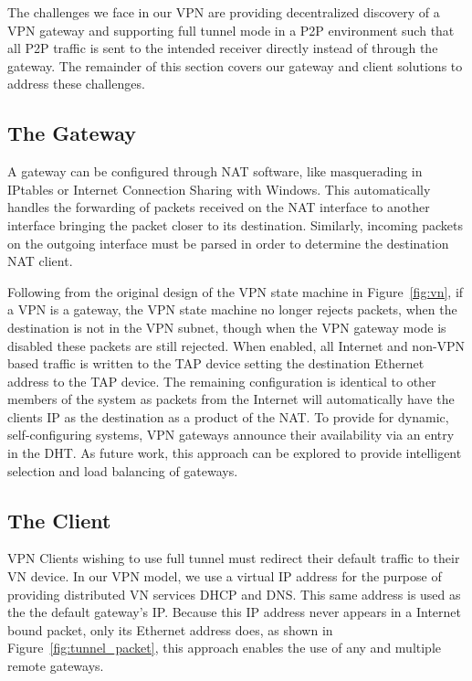 The challenges we face in our VPN are providing decentralized discovery of a
VPN gateway and supporting full tunnel mode in a P2P environment such that
all P2P traffic is sent to the intended receiver directly instead of through
the gateway.  The remainder of this section covers our gateway and client
solutions to address these challenges.

\subsection{The Gateway}
\label{the_gateway}
A gateway can be configured through NAT software, like masquerading in IPtables
or Internet Connection Sharing with Windows.  This automatically handles the
forwarding of packets received on the NAT interface to another interface
bringing the packet closer to its destination.  Similarly, incoming packets
on the outgoing interface must be parsed in order to determine the destination
NAT client.

Following from the original design of the VPN state machine in
Figure~\ref{fig:vn}, if a VPN is a gateway, the VPN state machine no longer
rejects packets, when the destination is not in the VPN subnet, though when the
VPN gateway mode is disabled these packets are still rejected.  When enabled,
all Internet and non-VPN based traffic is written to the TAP device setting the
destination Ethernet address to the TAP device.  The remaining configuration is
identical to other members of the system as packets from the Internet will
automatically have the clients IP as the destination as a product of the NAT.
To provide for dynamic, self-configuring systems, VPN gateways announce their
availability via an entry in the DHT.  As future work, this approach can be
explored to provide intelligent selection and load balancing of gateways.

\subsection{The Client}
VPN Clients wishing to use full tunnel must redirect their default traffic to
their VN device.  In our VPN model, we use a virtual IP address for the purpose
of providing distributed VN services DHCP and DNS.  This same address is used
as the the default gateway's IP.  Because this IP address never appears in a
Internet bound packet, only its Ethernet address does, as shown in
Figure~\ref{fig:tunnel_packet}, this approach enables the use of any and
multiple remote gateways.

